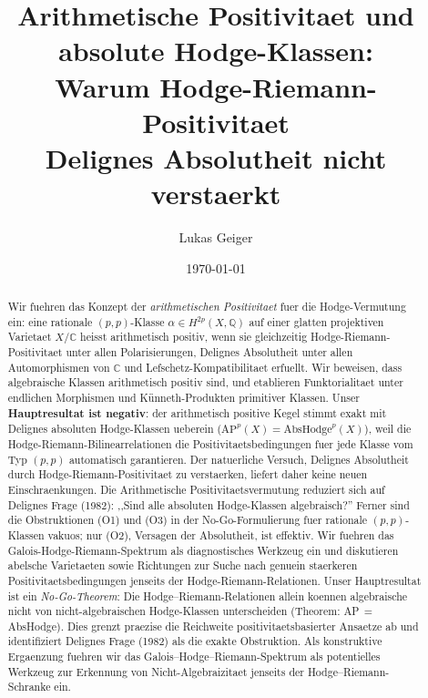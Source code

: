 \documentclass[aps,prd,twocolumn,superscriptaddress,nofootinbib]{revtex4-2}
\theoremstyle{definition}
\theoremstyle{remark}
\begin{document}

\title{Arithmetische Positivitaet und absolute Hodge-Klassen:\\Warum Hodge-Riemann-Positivitaet\\Delignes Absolutheit nicht verstaerkt}

\author{Lukas Geiger}

\date{\today}

\begin{abstract}
Wir fuehren das Konzept der \textit{arithmetischen Positivitaet} fuer die Hodge-Vermutung ein: eine rationale $(p,p)$-Klasse $\alpha \in H^{2p}(X, \mathbb{Q})$ auf einer glatten projektiven Varietaet $X/\mathbb{C}$ heisst arithmetisch positiv, wenn sie gleichzeitig Hodge-Riemann-Positivitaet unter allen Polarisierungen, Delignes Absolutheit unter allen Automorphismen von $\mathbb{C}$ und Lefschetz-Kompatibilitaet erfuellt. Wir beweisen, dass algebraische Klassen arithmetisch positiv sind, und etablieren Funktorialitaet unter endlichen Morphismen und K\"unneth-Produkten primitiver Klassen. Unser \textbf{Hauptresultat ist negativ}: der arithmetisch positive Kegel stimmt exakt mit Delignes absoluten Hodge-Klassen ueberein ($\mathrm{AP}^p(X) = \mathrm{AbsHodge}^p(X)$), weil die Hodge-Riemann-Bilinearrelationen die Positivitaetsbedingungen fuer jede Klasse vom Typ $(p,p)$ automatisch garantieren. Der natuerliche Versuch, Delignes Absolutheit durch Hodge-Riemann-Positivitaet zu verstaerken, liefert daher keine neuen Einschraenkungen. Die Arithmetische Positivitaetsvermutung reduziert sich auf Delignes Frage (1982): ,,Sind alle absoluten Hodge-Klassen algebraisch?'' Ferner sind die Obstruktionen (O1) und (O3) in der No-Go-Formulierung fuer rationale $(p,p)$-Klassen vakuos; nur (O2), Versagen der Absolutheit, ist effektiv. Wir fuehren das Galois-Hodge-Riemann-Spektrum als diagnostisches Werkzeug ein und diskutieren abelsche Varietaeten sowie Richtungen zur Suche nach genuein staerkeren Positivitaetsbedingungen jenseits der Hodge-Riemann-Relationen.
Unser Hauptresultat ist ein \emph{No-Go-Theorem}: Die Hodge--Riemann-Relationen allein koennen algebraische nicht von nicht-algebraischen Hodge-Klassen unterscheiden (Theorem: AP\,$=$\,AbsHodge). Dies grenzt praezise die Reichweite positivitaetsbasierter Ansaetze ab und identifiziert Delignes Frage (1982) als die exakte Obstruktion. Als konstruktive Ergaenzung fuehren wir das Galois--Hodge--Riemann-Spektrum als potentielles Werkzeug zur Erkennung von Nicht-Algebraizitaet jenseits der Hodge--Riemann-Schranke ein.
\end{abstract}
\end{document}
